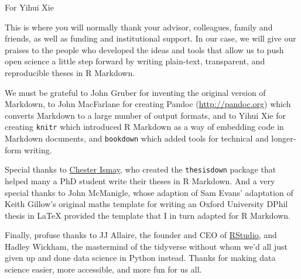 \documentclass[a4paper, nobind]{templates/ociamthesis}
\begin{document}

\begin{romanpages}

\maketitle

\begin{dedication}
  For Yihui Xie
\end{dedication}

\begin{acknowledgements}
 	This is where you will normally thank your advisor, colleagues, family and friends, as well as funding and institutional support. In our case, we will give our praises to the people who developed the ideas and tools that allow us to push open science a little step forward by writing plain-text, transparent, and reproducible theses in R Markdown.

  We must be grateful to John Gruber for inventing the original version of Markdown, to John MacFarlane for creating Pandoc (\url{http://pandoc.org}) which converts Markdown to a large number of output formats, and to Yihui Xie for creating \texttt{knitr} which introduced R Markdown as a way of embedding code in Markdown documents, and \texttt{bookdown} which added tools for technical and longer-form writing.

  Special thanks to \href{http://chester.rbind.io}{Chester Ismay}, who created the \texttt{thesisdown} package that helped many a PhD student write their theses in R Markdown. And a very special thanks to John McManigle, whose adaption of Sam Evans' adaptation of Keith Gillow's original maths template for writing an Oxford University DPhil thesis in LaTeX provided the template that I in turn adapted for R Markdown.

  Finally, profuse thanks to JJ Allaire, the founder and CEO of \href{http://rstudio.com}{RStudio}, and Hadley Wickham, the mastermind of the tidyverse without whom we'd all just given up and done data science in Python instead. Thanks for making data science easier, more accessible, and more fun for us all.


\end{acknowledgements}
\end{romanpages}
\end{document}
